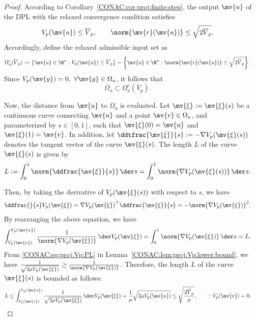 \begin{proof}

  According to Corollary~\ref{CONAC:cor:proj:finite:step}, the output $\mv{u}$ of
  the DPL with the relaxed convergence condition satisfies
  \begin{equation}
    V_p(\mv{u})\le\overline{V}_p,
    \qquad
    \norm{\mv{r}(\mv{u})}
    \le
    \sqrt{2\overline{V}_p}.
  \end{equation}
  Accordingly, define the relaxed admissible input set as
  \begin{equation}
    \label{CONAC:eq:proj:relaxed:admissible}
    \Omega_u^r(\overline{V}_p)
    :=
    \left\{
      \mv{u}\in\R^{n}
      :
      V_p(\mv{u})\le\overline{V}_p
    \right\}
    =
    \left\{
      \mv{u}\in\R^{n}
      :
      \norm{\mv{r}(\mv{u})}
      \le
      \sqrt{2\overline{V}_p}
    \right\}
    .
  \end{equation}
  Since $V_p(\mv{y})=0,\ \forall\mv{y}\in\Omega_u$, it follows that
  \begin{equation}
    \Omega_u
    \subset
    \Omega_u^r(\overline{V}_p)
    .
  \end{equation}

  Now, the distance from $\mv{u}$ to $\Omega_u$ is evaluated.
  Let $\mv{\xi}:=\mv{\xi}(s)$ be a continuous curve connecting $\mv{u}$ and a point $\mv{v}\in\Omega_u$, and parameterized by $s\in[0,1]$, such that $\mv{\xi}(0)=\mv{u}$ and $\mv{\xi}(1)=\mv{v}$.
  In addition, let $\ddtfrac{\mv{\xi}}{s}:=-\nabla V_p(\mv{\xi}(s))$ denotes the tangent vector of the curve $\mv{\xi}(s)$.
  The length $L$ of the curve $\mv{\xi}(s)$ is given by
  \begin{equation}
    L
    :=
    \int_0^1
    \norm{\ddfrac{\mv{\xi}}{s}}
    \,
    \der s
    =
    \int_0^1
    \norm{\nabla V_p(\mv{\xi}(s))}
    \,
    \der s
    .
  \end{equation}

  Then, by taking the derivative of $V_p(\mv{\xi}(s))$ with respect to $s$, we have
  \begin{equation}
    \ddfrac{}{s}
    V_p(\mv{\xi})
    =
    \nabla V_p(\mv{\xi})^\top
    \ddfrac{\mv{\xi}}{s}
    =
    -\norm{\nabla V_p(\mv{\xi})}^2
    .
  \end{equation}
  By rearranging the above equation, we have
  \begin{equation}
    \int_{V_p(\mv{v})}^{V_p(\mv{u})}
    \frac{1}{\norm{\nabla V_p(\mv{\xi})}}
    \,
    \der V_p(\mv{\xi})
    =
    \int_0^1
    \norm{\nabla V_p(\mv{\xi})}
    \,
    \der s
    =
    L
    .
  \end{equation}
  From \eqref{CONAC:eq:proj:Vp:PL} in Lemma~\ref{CONAC:lem:proj:Vp:lower:bound}, we have $\tfrac{1}{\sqrt{2\mu V_p(\mv{\xi})}}\ge\tfrac{1}{\norm{\nabla V_p(\mv{\xi})}}$.
  Therefore, the length $L$ of the curve $\mv{\xi}(s)$ is bounded as follows:
  \begin{equation}
    L
    \le
    \int_{V_p(\mv{v})}^{V_p(\mv{u})}
    \frac{1}{\sqrt{2\mu V_p(\mv{\xi})}}
    \,
    \der V_p(\mv{\xi})
    =
    \frac{1}{\mu} \sqrt{2\mu V_p(\mv{u})}
    \le
    \sqrt{\frac{2 \overline{V}_p}{\mu}}
    ,
    \qquad
    \because
    V_p(\mv{v})=0
    .
  \end{equation}


\end{proof}
